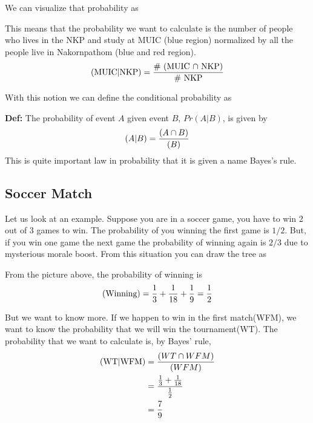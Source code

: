 \documentclass[a4paper, 12pt]{article}
\newcommand{\half}{\ensuremath{\frac{1}{2}}}
\newcommand{\definition}{\vspace{1em}\noindent\textbf{Def:} }
\let\Pr\relax
\DeclareMathOperator{\Pr}{Pr}
\begin{document}
\begin{multicols}{2}
We can visualize that probability as
\begin{center}
\end{center}

This means that the probability we want to calculate is the number of people who lives in the NKP and study at MUIC (blue region) normalized by all the people live in Nakornpathom (blue and red region).
\[
	\Pr(\text{MUIC}|\text{NKP}) = \frac{\text{\# (MUIC $\cap$ NKP)}}{\text{\# NKP}}
\]

With this notion we can define the conditional probability as

\definition The probability of event $A$ given event $B$, $Pr(A|B)$, is given by
\[
	\Pr(A|B) = \frac{\Pr(A \cap B)}{\Pr(B)}
\]
This is quite important law in probability that it is given a name Bayes's rule.

\subsection*{Soccer Match}

Let us look at an example. Suppose you are in a soccer game, you have to win 2 out of 3 games to win. The probability of you winning the first game is $1/2$. But, if you win one game the next game the probability of winning again is $2/3$ due to mysterious morale boost. From this situation you can draw the tree as

\begin{center}
	
\end{center}

From the picture above, the probability of winning is
\[
	\Pr(\text{Winning}) = \frac{1}{3} + \frac{1}{18} + \frac{1}{9} = \half
\]

But we want to know more. If we happen to win in the first match(WFM), we want to know the probability that we will win the tournament(WT). The probability that we want to calculate is, by Bayes' rule,
\begin{align*}
	\Pr(\text{WT} | \text{WFM}) &= \frac{\Pr(WT \cap WFM)}{\Pr(WFM)} \\
	&= \frac{\frac{1}{3} + \frac{1}{18}}{\frac{1}{2}}\\
	&= \frac{7}{9}
\end{align*}


\end{multicols}
\end{document}
